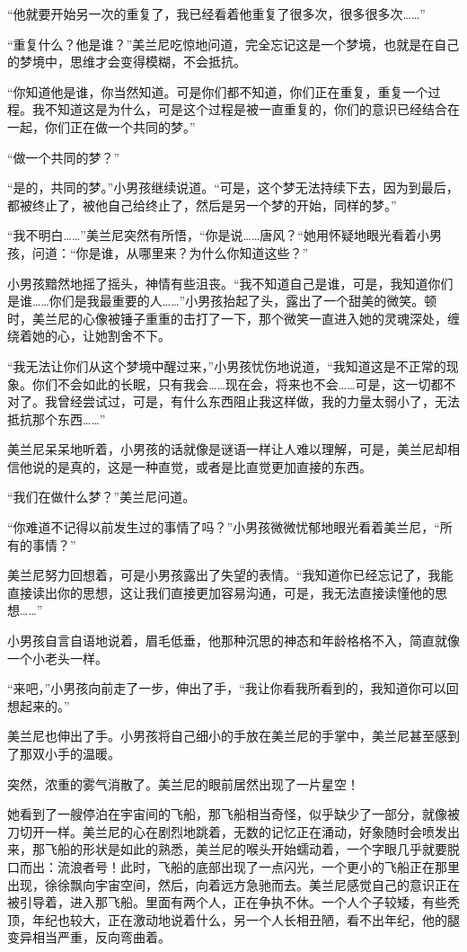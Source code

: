 “他就要开始另一次的重复了，我已经看着他重复了很多次，很多很多次……” 

“重复什么？他是谁？”美兰尼吃惊地问道，完全忘记这是一个梦境，也就是在自己的梦境中，思维才会变得模糊，不会抵抗。 

“你知道他是谁，你当然知道。可是你们都不知道，你们正在重复，重复一个过程。我不知道这是为什么，可是这个过程是被一直重复的，你们的意识已经结合在一起，你们正在做一个共同的梦。” 

“做一个共同的梦？” 

“是的，共同的梦。”小男孩继续说道。“可是，这个梦无法持续下去，因为到最后，都被终止了，被他自己给终止了，然后是另一个梦的开始，同样的梦。” 

“我不明白……”美兰尼突然有所悟，“你是说……唐风？“她用怀疑地眼光看着小男孩，问道：“你是谁，从哪里来？为什么你知道这些？” 

小男孩黯然地摇了摇头，神情有些沮丧。“我不知道自己是谁，可是，我知道你们是谁……你们是我最重要的人……”小男孩抬起了头，露出了一个甜美的微笑。顿时，美兰尼的心像被锤子重重的击打了一下，那个微笑一直进入她的灵魂深处，缠绕着她的心，让她割舍不下。 

“我无法让你们从这个梦境中醒过来，”小男孩忧伤地说道，“我知道这是不正常的现象。你们不会如此的长眠，只有我会……现在会，将来也不会……可是，这一切都不对了。我曾经尝试过，可是，有什么东西阻止我这样做，我的力量太弱小了，无法抵抗那个东西……” 

美兰尼呆呆地听着，小男孩的话就像是谜语一样让人难以理解，可是，美兰尼却相信他说的是真的，这是一种直觉，或者是比直觉更加直接的东西。 

“我们在做什么梦？”美兰尼问道。 

“你难道不记得以前发生过的事情了吗？”小男孩微微忧郁地眼光看着美兰尼，“所有的事情？” 

美兰尼努力回想着，可是小男孩露出了失望的表情。“我知道你已经忘记了，我能直接读出你的思想，这让我们直接更加容易沟通，可是，我无法直接读懂他的思想……” 

小男孩自言自语地说着，眉毛低垂，他那种沉思的神态和年龄格格不入，简直就像一个小老头一样。 

“来吧，”小男孩向前走了一步，伸出了手，“我让你看我所看到的，我知道你可以回想起来的。” 

美兰尼也伸出了手。小男孩将自己细小的手放在美兰尼的手掌中，美兰尼甚至感到了那双小手的温暖。 

突然，浓重的雾气消散了。美兰尼的眼前居然出现了一片星空！ 

她看到了一艘停泊在宇宙间的飞船，那飞船相当奇怪，似乎缺少了一部分，就像被刀切开一样。美兰尼的心在剧烈地跳着，无数的记忆正在涌动，好象随时会喷发出来，那飞船的形状是如此的熟悉，美兰尼的喉头开始蠕动着，一个字眼几乎就要脱口而出：流浪者号！此时，飞船的底部出现了一点闪光，一个更小的飞船正在那里出现，徐徐飘向宇宙空间，然后，向着远方急驰而去。美兰尼感觉自己的意识正在被引导着，进入那飞船。里面有两个人，正在争执不休。一个人个子较矮，有些秃顶，年纪也较大，正在激动地说着什么，另一个人长相丑陋，看不出年纪，他的腿变异相当严重，反向弯曲着。 

